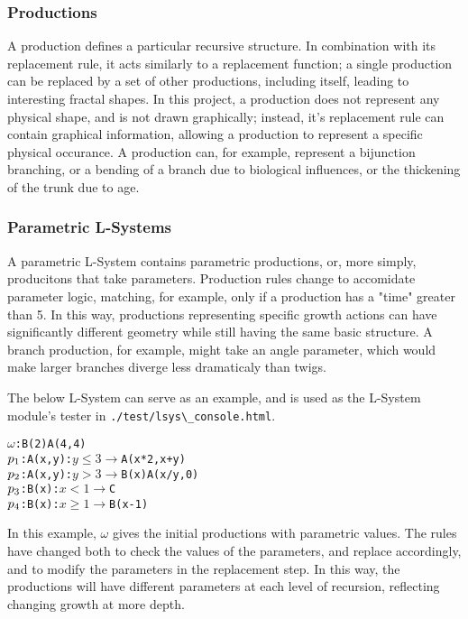 \documentclass{article}
\newcommand{\tab}{\hspace*{2em}}
\begin{document}
            \subsubsection{Productions}
    \tab A production defines a particular recursive structure. In combination with its replacement
rule, it acts similarly to a replacement function; a single production can be replaced by a set of
other productions, including itself, leading to interesting fractal shapes. In this project, a
production does not represent any physical shape, and is not drawn graphically; instead, it's 
replacement rule can contain graphical information, allowing a production to represent a specific
physical occurance. A production can, for example, represent a bijunction branching, or a bending
of a branch due to biological influences, or the thickening of the trunk due to age.

            \subsubsection{Parametric L-Systems}
    \tab A parametric L-System contains parametric productions, or, more simply, producitons that
take parameters. Production rules change to accomidate parameter logic, matching, for example, only
if a production has a "time" greater than 5. In this way, productions representing specific growth
actions can have significantly different geometry while still having the same basic structure. A
branch production, for example, might take an angle parameter, which would make larger branches
diverge less dramaticaly than twigs.

    \tab The below L-System can serve as an example, and is used as the L-System module's tester in
\verb|./test/lsys\_console.html|.
    \begin{alltt}
    \(\omega\)  : B(2)A(4,4)
    \(p\sb{1}\) : A(x,y) : \(y \leq 3 \rightarrow\) A(x*2, x+y)
    \(p\sb{2}\) : A(x,y) : \(y > 3 \rightarrow\) B(x)A(x/y, 0)
    \(p\sb{3}\) : B(x)   : \(x < 1  \rightarrow\) C
    \(p\sb{4}\) : B(x)   : \(x \geq 1 \rightarrow\) B(x-1)   
    \end{alltt}
In this example, $\omega$ gives the initial productions with parametric values. The rules have
changed both to check the values of the parameters, and replace accordingly, and to modify the
parameters in the replacement step. In this way, the productions will have different parameters at
each level of recursion, reflecting changing growth at more depth.
\end{document}

